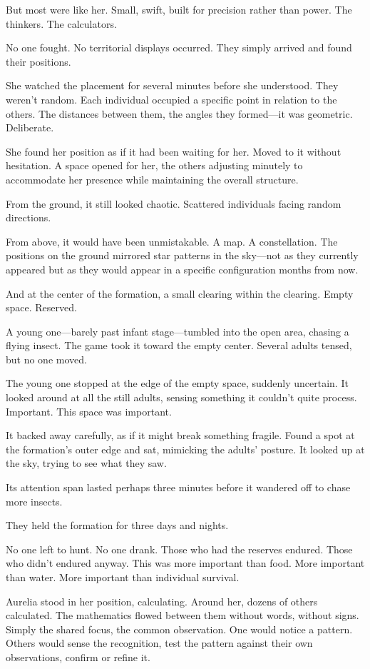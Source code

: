 But most were like her. Small, swift, built for precision rather than power. The thinkers. The calculators.

No one fought. No territorial displays occurred. They simply arrived and found their positions.

She watched the placement for several minutes before she understood. They weren't random. Each individual occupied a specific point in relation to the others. The distances between them, the angles they formed—it was geometric. Deliberate.

She found her position as if it had been waiting for her. Moved to it without hesitation. A space opened for her, the others adjusting minutely to accommodate her presence while maintaining the overall structure.

From the ground, it still looked chaotic. Scattered individuals facing random directions.

From above, it would have been unmistakable. A map. A constellation. The positions on the ground mirrored star patterns in the sky—not as they currently appeared but as they would appear in a specific configuration months from now.

And at the center of the formation, a small clearing within the clearing. Empty space. Reserved.

A young one—barely past infant stage—tumbled into the open area, chasing a flying insect. The game took it toward the empty center. Several adults tensed, but no one moved.

The young one stopped at the edge of the empty space, suddenly uncertain. It looked around at all the still adults, sensing something it couldn't quite process. Important. This space was important.

It backed away carefully, as if it might break something fragile. Found a spot at the formation's outer edge and sat, mimicking the adults' posture. It looked up at the sky, trying to see what they saw.

Its attention span lasted perhaps three minutes before it wandered off to chase more insects.

\scenebreak

They held the formation for three days and nights.

No one left to hunt. No one drank. Those who had the reserves endured. Those who didn't endured anyway. This was more important than food. More important than water. More important than individual survival.

Aurelia stood in her position, calculating. Around her, dozens of others calculated. The mathematics flowed between them without words, without signs. Simply the shared focus, the common observation. One would notice a pattern. Others would sense the recognition, test the pattern against their own observations, confirm or refine it.

